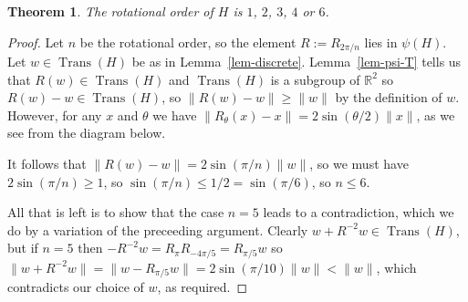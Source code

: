 \documentclass{amsart}
\DeclareMathOperator{\Trans}    {Trans}
\newcommand{\R}         {{\mathbb{R}}}
\newcommand{\blob}      {circle(0.03cm)}
\renewcommand{\:}{\colon}
\newtheorem{theorem}{Theorem}[section]
\theoremstyle{definition}
\begin{document}
\begin{theorem}
 The rotational order of $H$ is $1$, $2$, $3$, $4$ or $6$.
\end{theorem}
\begin{proof}
 Let $n$ be the rotational order, so the element $R:=R_{2\pi/n}$ lies
 in $\psi(H)$.  Let $w\in \Trans(H)$ be as in Lemma~\ref{lem-discrete}.
 Lemma~\ref{lem-psi-T} tells us that $R(w)\in \Trans(H)$ and
 $\Trans(H)$ is a subgroup of $\R^2$ so $R(w)-w\in \Trans(H)$, so
 $\|R(w)-w\|\geq\|w\|$ by the definition of $w$.  However, for any $x$
 and $\theta$ we have $\|R_\theta(x)-x\|=2\sin(\theta/2)\|x\|$, as we see
 from the diagram below.
 \begin{center}
 \end{center}
 It follows that $\|R(w)-w\|=2\sin(\pi/n)\|w\|$, so we must have
 $2\sin(\pi/n)\geq 1$, so $\sin(\pi/n)\leq 1/2=\sin(\pi/6)$, so
 $n\leq 6$.

 All that is left is to show that the case $n=5$ leads to a
 contradiction, which we do by a variation of the preceeding argument.
 Clearly $w+R^{-2}w\in \Trans(H)$, but if $n=5$ then
 $-R^{-2}w=R_\pi R_{-4\pi/5}=R_{\pi/5}w$ so
 $\|w+R^{-2}w\|=\|w-R_{\pi/5}w\|=2\sin(\pi/10)\|w\|<\|w\|$, which
 contradicts our choice of $w$, as required.
\end{proof}
\end{document}
